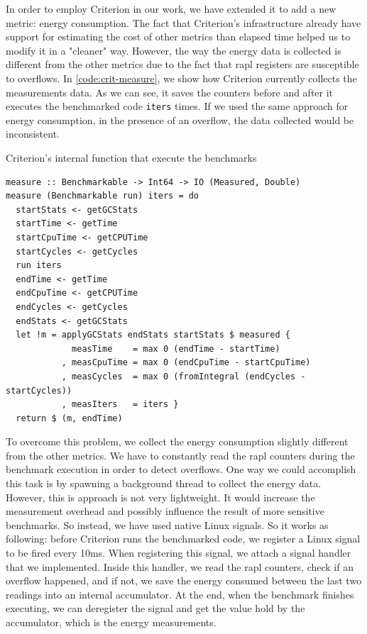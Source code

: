 In order to employ Criterion in our work, we have extended it to add a new metric: energy consumption. The fact that Criterion's infrastructure already have support for estimating the cost of other metrics than elapsed time helped us to modify it in a "cleaner" way. However, the way the energy data is collected is different from the other metrics due to the fact that \ac{rapl} registers are susceptible to overflows. In \autoref{code:crit-measure}, we show how Criterion currently collects the measurements data. As we can see, it saves the counters before and after it executes the benchmarked code \texttt{iters} times. If we used the same approach for energy consumption, in the presence of an overflow, the data collected would be inconsistent.

\begin{listing}
  \caption{Criterion's internal function that execute the benchmarks}
  \begin{verbatim}
measure :: Benchmarkable -> Int64 -> IO (Measured, Double)
measure (Benchmarkable run) iters = do
  startStats <- getGCStats
  startTime <- getTime
  startCpuTime <- getCPUTime
  startCycles <- getCycles
  run iters
  endTime <- getTime
  endCpuTime <- getCPUTime
  endCycles <- getCycles
  endStats <- getGCStats
  let !m = applyGCStats endStats startStats $ measured {
             measTime    = max 0 (endTime - startTime)
           , measCpuTime = max 0 (endCpuTime - startCpuTime)
           , measCycles  = max 0 (fromIntegral (endCycles - startCycles))
           , measIters   = iters }
  return $ (m, endTime)
  \end{verbatim}
  \label{code:crit-measure}
\end{listing}

To overcome this problem, we collect the energy consumption slightly different from the other metrics. We have to constantly read the \ac{rapl} counters during the benchmark execution in order to detect overflows. One way we could accomplish this task is by spawning a background thread to collect the energy data. However, this is approach is not very lightweight. It would increase the measurement overhead and possibly influence the result of more sensitive benchmarks. So instead, we have used native Linux signals. So it works as following: before Criterion runs the benchmarked code, we register a Linux signal to be fired every 10ms. When registering this signal, we attach a signal handler that we implemented. Inside this handler, we read the \ac{rapl} counters, check if an overflow happened, and if not, we save the energy consumed between the last two readings into an internal accumulator. At the end, when the benchmark finishes executing, we can deregister the signal and get the value hold by the accumulator, which is the energy measurements.

